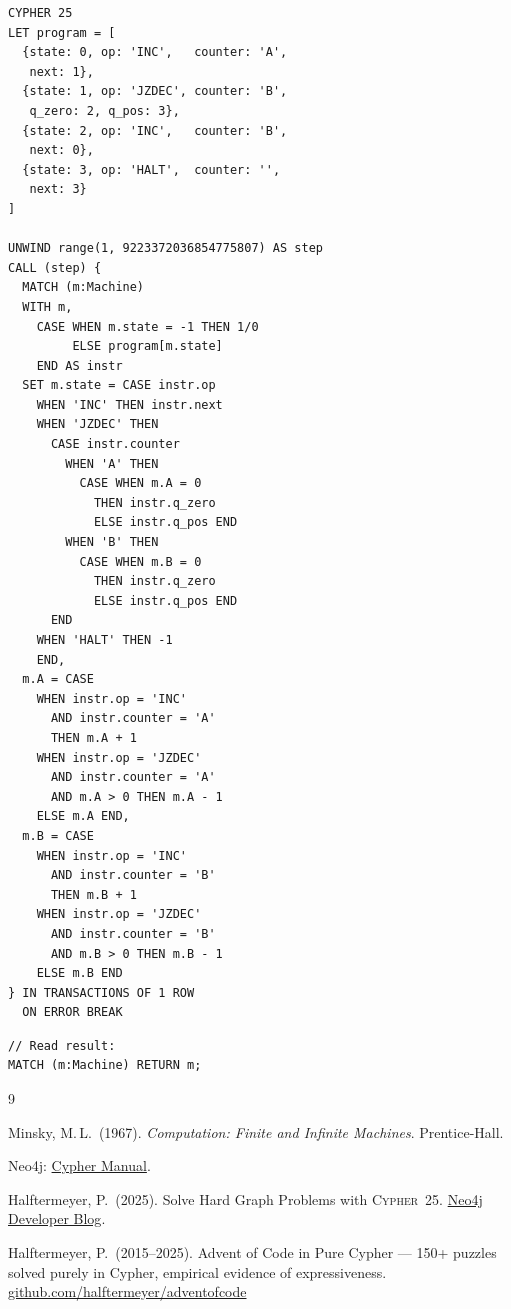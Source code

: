 \documentclass[9pt,a4paper,twocolumn]{article}
\begin{document}
\vspace{-0.5em}

\begin{smallcode}
\begin{lstlisting}[style=cypher-dense]
CYPHER 25
LET program = [
  {state: 0, op: 'INC',   counter: 'A',
   next: 1},
  {state: 1, op: 'JZDEC', counter: 'B',
   q_zero: 2, q_pos: 3},
  {state: 2, op: 'INC',   counter: 'B',
   next: 0},
  {state: 3, op: 'HALT',  counter: '',
   next: 3}
]

UNWIND range(1, 9223372036854775807) AS step
CALL (step) {
  MATCH (m:Machine)
  WITH m,
    CASE WHEN m.state = -1 THEN 1/0
         ELSE program[m.state]
    END AS instr
  SET m.state = CASE instr.op
    WHEN 'INC' THEN instr.next
    WHEN 'JZDEC' THEN
      CASE instr.counter
        WHEN 'A' THEN
          CASE WHEN m.A = 0
            THEN instr.q_zero
            ELSE instr.q_pos END
        WHEN 'B' THEN
          CASE WHEN m.B = 0
            THEN instr.q_zero
            ELSE instr.q_pos END
      END
    WHEN 'HALT' THEN -1
    END,
  m.A = CASE
    WHEN instr.op = 'INC'
      AND instr.counter = 'A'
      THEN m.A + 1
    WHEN instr.op = 'JZDEC'
      AND instr.counter = 'A'
      AND m.A > 0 THEN m.A - 1
    ELSE m.A END,
  m.B = CASE
    WHEN instr.op = 'INC'
      AND instr.counter = 'B'
      THEN m.B + 1
    WHEN instr.op = 'JZDEC'
      AND instr.counter = 'B'
      AND m.B > 0 THEN m.B - 1
    ELSE m.B END
} IN TRANSACTIONS OF 1 ROW
  ON ERROR BREAK
\end{lstlisting}
\end{smallcode}

\begin{smallcode}
\begin{lstlisting}[style=cypher-dense]
// Read result:
MATCH (m:Machine) RETURN m;
\end{lstlisting}
\end{smallcode}

\begin{thebibliography}{9}
\small

Minsky, M.\,L.\ (1967). \emph{Computation: Finite and Infinite Machines}. Prentice-Hall.

Neo4j: \href{https://neo4j.com/docs/cypher-manual/current/}{Cypher Manual}.

Halftermeyer, P.\ (2025). Solve Hard Graph Problems with \textsc{Cypher~25}.
\href{https://neo4j.com/blog/developer/solve-hard-graph-problems-with-cypher-25/}{Neo4j Developer Blog}.

Halftermeyer, P.\ (2015--2025). Advent of Code in Pure Cypher ---
150+ puzzles solved purely in Cypher, empirical evidence of expressiveness.
\href{https://github.com/halftermeyer/adventofcode}{github.com/halftermeyer/adventofcode}

\end{thebibliography}
\end{document}
